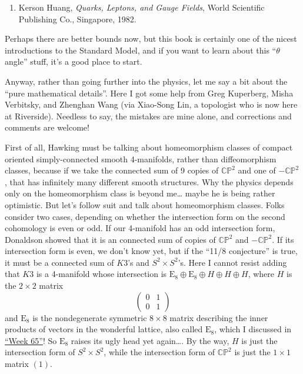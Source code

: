 \documentclass{article}
\def\tightlist{}
\begin{document}
\begin{enumerate}
\def\labelenumi{\arabic{enumi})}
\setcounter{enumi}{2}
\tightlist
\item
  Kerson Huang, \emph{Quarks, Leptons, and Gauge Fields}, World
  Scientific Publishing Co., Singapore, 1982.
\end{enumerate}

Perhaps there are better bounds now, but this book is certainly one of
the nicest introductions to the Standard Model, and if you want to learn
about this ``\(\theta\) angle'' stuff, it's a good place to start.

Anyway, rather than going further into the physics, let me say a bit
about the ``pure mathematical details''. Here I got some help from Greg
Kuperberg, Misha Verbitsky, and Zhenghan Wang (via Xiao-Song Lin, a
topologist who is now here at Riverside). Needless to say, the mistakes
are mine alone, and corrections and comments are welcome!

First of all, Hawking must be talking about homeomorphism classes of
compact oriented simply-connected smooth 4-manifolds, rather than
diffeomorphism classes, because if we take the connected sum of 9 copies
of \(\mathbb{CP}^2\) and one of \(-\mathbb{CP}^2\), that has infinitely
many different smooth structures. Why the physics depends only on the
homeomorphism class is beyond me\ldots{} maybe he is being rather
optimistic. But let's follow suit and talk about homeomorphism classes.
Folks consider two cases, depending on whether the intersection form on
the second cohomology is even or odd. If our 4-manifold has an odd
intersection form, Donaldson showed that it is an connected sum of
copies of \(\mathbb{CP}^2\) and \(-\mathbb{CP}^2\). If its intersection
form is even, we don't know yet, but if the ``11/8 conjecture'' is true,
it must be a connected sum of \(K3\)'s and \(S^2 \times S^2\)'s. Here I
cannot resist adding that \(K3\) is a 4-manifold whose intersection is
\(\mathrm{E}_8 \oplus \mathrm{E}_8 \oplus H \oplus H \oplus H\), where
\(H\) is the \(2\times2\) matrix \[
  \left(
    \begin{array}{cc}
      0&1\\0&1
    \end{array}
  \right)
\] and \(\mathrm{E}_8\) is the nondegenerate symmetric \(8\times8\)
matrix describing the inner products of vectors in the wonderful
lattice, also called \(\mathrm{E}_8\), which I discussed in
\protect\hyperlink{week65}{``Week 65''}! So \(\mathrm{E}_8\) raises its
ugly head yet again\ldots. By the way, \(H\) is just the intersection
form of \(S^2 \times S^2\), while the intersection form of
\(\mathbb{CP}^2\) is just the \(1\times1\) matrix \((1)\).
\end{document}
